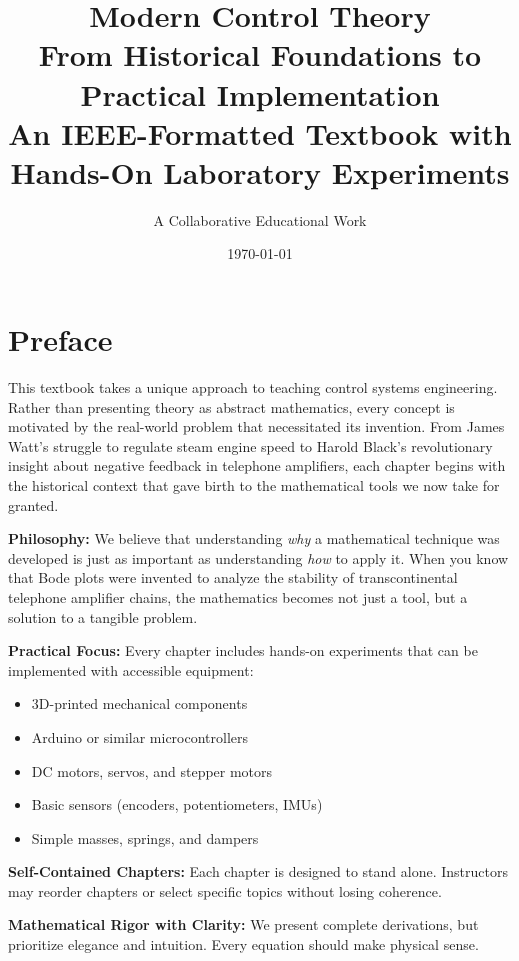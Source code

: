 \documentclass[12pt,twoside]{book}
\title{\textbf{Modern Control Theory}\\[0.5cm]
\Large From Historical Foundations to Practical Implementation\\[1cm]
\normalsize An IEEE-Formatted Textbook with Hands-On Laboratory Experiments}
\author{A Collaborative Educational Work}
\date{\today}
\theoremstyle{definition}
\theoremstyle{plain}
\begin{document}
\frontmatter
\maketitle

\chapter*{Preface}

This textbook takes a unique approach to teaching control systems engineering. Rather than presenting theory as abstract mathematics, every concept is motivated by the real-world problem that necessitated its invention. From James Watt's struggle to regulate steam engine speed to Harold Black's revolutionary insight about negative feedback in telephone amplifiers, each chapter begins with the historical context that gave birth to the mathematical tools we now take for granted.

\textbf{Philosophy:} We believe that understanding \textit{why} a mathematical technique was developed is just as important as understanding \textit{how} to apply it. When you know that Bode plots were invented to analyze the stability of transcontinental telephone amplifier chains, the mathematics becomes not just a tool, but a solution to a tangible problem.

\textbf{Practical Focus:} Every chapter includes hands-on experiments that can be implemented with accessible equipment:
\begin{itemize}
    \item 3D-printed mechanical components
    \item Arduino or similar microcontrollers
    \item DC motors, servos, and stepper motors
    \item Basic sensors (encoders, potentiometers, IMUs)
    \item Simple masses, springs, and dampers
\end{itemize}

\textbf{Self-Contained Chapters:} Each chapter is designed to stand alone. Instructors may reorder chapters or select specific topics without losing coherence.

\textbf{Mathematical Rigor with Clarity:} We present complete derivations, but prioritize elegance and intuition. Every equation should make physical sense.

\tableofcontents

\mainmatter
\end{document}
